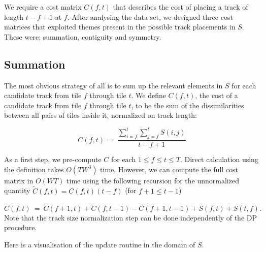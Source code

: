 \documentclass[twocolumn]{article}
\begin{document}
We require a cost matrix $C(f,t)$ that describes the cost of placing a track of length $t-f+1$ at $f$. After analysing the data set, we designed three cost matrices that exploited themes present in the possible track placements in $S$. These were; summation, contiguity and symmetry.  

\subsection{Summation}

The most obvious strategy of all is to sum up the relevant elements in $S$ for each candidate track from tile $f$ through tile $t$. We define $C(f,t)$, the cost of a candidate track from tile $f$ through tile $t$, to be the sum of the dissimilarities between all pairs of tiles inside it, normalized on track length:

\begin{dmath*}
C(f,t) ~=~ \frac{ \sum_{i=f}^{t} \sum_{j=f}^{t} S(i,j) }{ t-f+1 }
\end{dmath*}

As a first step, we pre-compute $C$ for each $1 \le f \le t \le T$. Direct calculation using the definition takes $O(T W^3)$ time. However, we can compute the full cost matrix in $O(W T)$ time using the following recursion for the unnormalized quantity $\tilde
C(f,t) = C(f,t)(t-f)$ (for $f+1 \le t-1$)

\begin{dmath*}
\tilde C(f,t) ~=~ \tilde C(f+1,t) + \tilde C(f,t-1) - \tilde C(f+1,t-1) + S(f,t) + S(t,f)
.
\end{dmath*}
 Note that the track size normalization step can be done independently of the DP procedure. 

Here is a visualisation of the update routine in the domain of $S$.

    \begin{center}
    \end{center}
\end{document}
